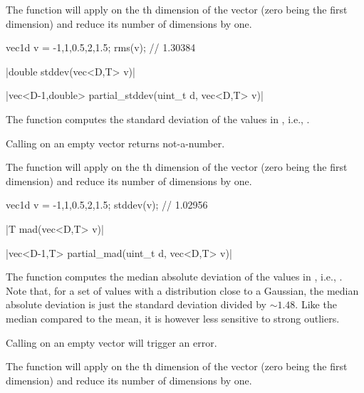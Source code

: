 The function  will apply  on the th dimension of the vector (zero being the first dimension) and reduce its number of dimensions by one.

\begin{example}
\begin{cppcode}
vec1d v = {-1,1,0.5,2,1.5};
rms(v); // 1.30384
\end{cppcode}
\end{example}

\funcitem \cppinline|double stddev(vec<D,T> v)| 

\cppinline|vec<D-1,double> partial_stddev(uint_t d, vec<D,T> v)| 

The function  computes the standard deviation of the values in , i.e., .

Calling  on an empty vector returns not-a-number.

The function  will apply  on the th dimension of the vector (zero being the first dimension) and reduce its number of dimensions by one.

\begin{example}
\begin{cppcode}
vec1d v = {-1,1,0.5,2,1.5};
stddev(v); // 1.02956
\end{cppcode}
\end{example}

\funcitem \cppinline|T mad(vec<D,T> v)| 

\cppinline|vec<D-1,T> partial_mad(uint_t d, vec<D,T> v)| 

The function  computes the median absolute deviation of the values in , i.e., . Note that, for a set of values with a distribution close to a Gaussian, the median absolute deviation is just the standard deviation divided by $\sim1.48$. Like the median compared to the mean, it is however less sensitive to strong outliers.

Calling  on an empty vector will trigger an error.

The function  will apply  on the th dimension of the vector (zero being the first dimension) and reduce its number of dimensions by one.

